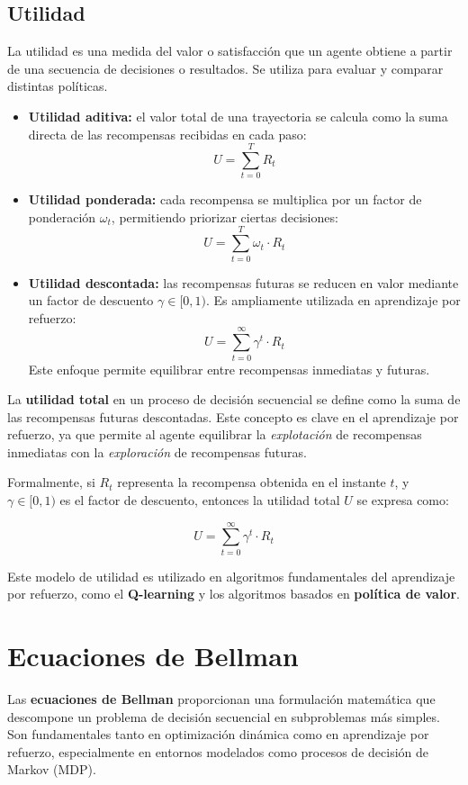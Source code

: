 \subsection*{Utilidad}

La utilidad es una medida del valor o satisfacción que un agente obtiene a partir de una secuencia de decisiones o resultados. Se utiliza para evaluar y comparar distintas políticas.

\begin{itemize}
    \item \textbf{Utilidad aditiva:} el valor total de una trayectoria se calcula como la suma directa de las recompensas recibidas en cada paso:
    \[
    U = \sum_{t=0}^{T} R_t
    \]

    \item \textbf{Utilidad ponderada:} cada recompensa se multiplica por un factor de ponderación $\omega_t$, permitiendo priorizar ciertas decisiones:
    \[
    U = \sum_{t=0}^{T} \omega_t \cdot R_t
    \]

    \item \textbf{Utilidad descontada:} las recompensas futuras se reducen en valor mediante un factor de descuento $\gamma \in [0,1)$. Es ampliamente utilizada en aprendizaje por refuerzo:
    \[
    U = \sum_{t=0}^{\infty} \gamma^t \cdot R_t
    \]
    Este enfoque permite equilibrar entre recompensas inmediatas y futuras.
\end{itemize}

La \textbf{utilidad total} en un proceso de decisión secuencial se define como la suma de las recompensas futuras descontadas. Este concepto es clave en el aprendizaje por refuerzo, ya que permite al agente equilibrar la \textit{explotación} de recompensas inmediatas con la \textit{exploración} de recompensas futuras.

Formalmente, si $R_t$ representa la recompensa obtenida en el instante $t$, y $\gamma \in [0,1)$ es el factor de descuento, entonces la utilidad total $U$ se expresa como:

\[
U = \sum_{t=0}^{\infty} \gamma^t \cdot R_t
\]

Este modelo de utilidad es utilizado en algoritmos fundamentales del aprendizaje por refuerzo, como el \textbf{Q-learning} y los algoritmos basados en \textbf{política de valor}.


\section{Ecuaciones de Bellman}
Las \textbf{ecuaciones de Bellman} proporcionan una formulación matemática que descompone un problema de decisión secuencial en subproblemas más simples. Son fundamentales tanto en optimización dinámica como en aprendizaje por refuerzo, especialmente en entornos modelados como procesos de decisión de Markov (MDP).

